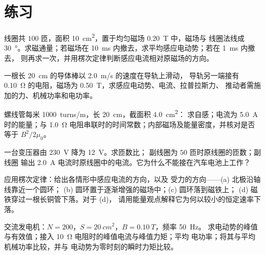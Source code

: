 \section{练习}

\begin{exercise}[$\star$]\label{exo:b1:induction:1}
线圈共 $100$ 匝，面积 \qty{10}{cm^2}，置于均匀磁场 \qty{0.20}{T} 中，磁场与
线圈法线成 \qty{30}{\degree}。求磁通量；若磁场在
\qty{10}{ms} 内撤去，求平均感应电动势；若在 \qty{1}{ms} 内撤去，
则再求一次，并用楞次定律判断感应电流相对原磁场的方向。
\end{exercise}

\begin{exercise}[$\star$]\label{exo:b1:induction:2}
一根长 \qty{20}{cm} 的导体棒以 \qty{2.0}{m/s} 的速度在导轨上滑动，
导轨另一端接有 \qty{0.10}{\ohm} 的电阻，磁场为 \qty{0.50}{T}，求感应电动势、电流、拉普拉斯力、
推动者需施加的力、机械功率和电功率。
\end{exercise}

\begin{exercise}[$\star$]\label{exo:b1:induction:3}
螺线管每米 \qty{1000}{turns/m}，长 \qty{20}{cm}，截面积 \qty{4.0}{cm^2}：
求自感；电流为 \qty{5.0}{A} 时的能量；与 \qty{1.0}{\ohm}
电阻串联时的时间常数；内部磁场及能量密度，并核对是否等于 $B^2/2\mu_0$。
\end{exercise}

\begin{exercise}[$\star$]\label{exo:b1:induction:4}
一台变压器由 \qty{230}{V} 降为 \qty{12}{V}。求匝数比；
副线圈为 $50$ 匝时原线圈的匝数；副线圈
输出 \qty{2.0}{A} 电流时原线圈中的电流。它为什么不能接在汽车电池上工作？
\end{exercise}

\begin{exercise}[$\star\star$]\label{exo:b1:induction:5}
应用楞次定律：给出各情形中感应电流的方向，以及
受力的方向——(a) 北极沿轴线靠近一个圆环；
(b) 圆环置于逐渐增强的磁场中；(c) 圆环落到磁铁上；
(d) 磁铁穿过一根长铜管下落。对于 (d)，
请用能量观点解释它为何以较小的恒定速率下落。
\end{exercise}

\begin{exercise}[$\star\star$]\label{exo:b1:induction:6}
交流发电机：$N = 200$，$S = \qty{20}{cm^2}$，$B = \qty{0.10}{T}$，频率 \qty{50}{Hz}。
求电动势的峰值与有效值；接入 \qty{10}{\ohm} 电阻时的峰值电流与峰值力矩；平均
电功率；将其与平均机械功率比较，并与
电动势为零时刻的瞬时力矩比较。
\end{exercise}

